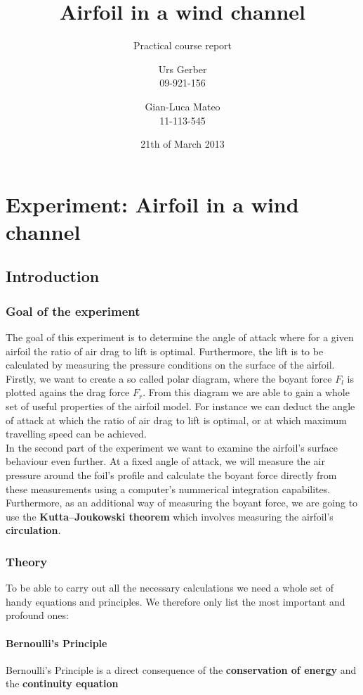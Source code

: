 \documentclass{scrreprt}
\author{Urs Gerber\\09-921-156 \and Gian-Luca Mateo\\11-113-545}
\date{21th of March 2013}
\title{Airfoil in a wind channel}
\subtitle{Practical course report}
\begin{document}
\maketitle

\tableofcontents
\newpage

\chapter{Experiment: Airfoil in a wind channel}
\section{Introduction}
\subsection{Goal of the experiment}
The goal of this experiment is to determine the angle of attack where for a given airfoil the ratio of air drag to lift is optimal. Furthermore, the lift is to be calculated by measuring the pressure conditions on the surface of the airfoil.\\

Firstly, we want to create a so called polar diagram, where the boyant force $F_l$ is plotted agains the drag force $F_r$. From this diagram we are able to gain a whole set of useful properties of the airfoil model. For instance we can deduct the angle of attack at which the ratio of air drag to lift is optimal, or at which maximum travelling speed can be achieved.\\

In the second part of the experiment we want to examine the airfoil's surface behaviour even further. At a fixed angle of attack, we will measure the air pressure around the foil's profile and calculate the boyant force directly from these measurements using a computer's nummerical integration capabilites. Furthermore, as an additional way of measuring the boyant force, we are going to use the \textbf{Kutta–Joukowski theorem} which involves measuring the airfoil's \textbf{circulation}.

\subsection{Theory}
To be able to carry out all the necessary calculations we need a whole set of handy equations and principles. We therefore only list the most important and profound ones:

\subsubsection{Bernoulli's Principle}
Bernoulli's Principle is a direct consequence of the \textbf{conservation of energy} and the \textbf{continuity equation}
\end{document}
